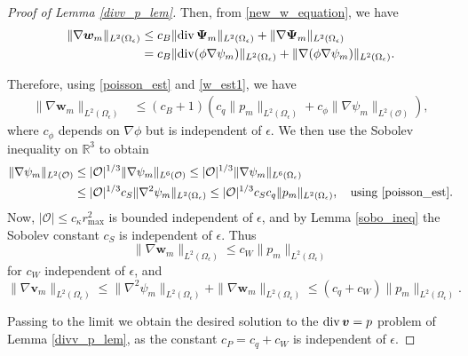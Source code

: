 \documentclass[11pt]{article}
\numberwithin{equation}{section}
\newcommand{\R}{\mathbb{R}}
\newcommand{\T}{\mathbb{T}}
\newcommand{\bu}{\bm{u}}
\newcommand{\bw}{\bm{w}}
\newcommand{\bv}{\bm{v}}
\newcommand{\ts}{\thinspace}
\newcommand{\dive}{{\rm{div}}}
\theoremstyle{definition}
\begin{document}
\begin{proof}[Proof of Lemma \ref{divv_p_lem}]
Then, from \eqref{new_w_equation}, we have
\begin{equation}\label{w_est1}
\begin{aligned}
\|\nabla\bw_m\|_{L^2(\Omega_{\epsilon})} &\le c_B\|\dive\ts {\bm \Psi}_m\|_{L^2(\Omega_{\epsilon})} + \|\nabla{\bm \Psi}_m\|_{L^2(\Omega_{\epsilon})} \\
&= c_B\|\dive(\phi\nabla \psi_m) \|_{L^2(\Omega_{\epsilon})} + \|\nabla(\phi\nabla \psi_m)\|_{L^2(\Omega_{\epsilon})} .
\end{aligned}
\end{equation}

Therefore, using \eqref{poisson_est} and \eqref{w_est1}, we have
\begin{align*}
\|\nabla \bw_m\|_{L^2(\Omega_{\epsilon})} &\le (c_B+1)(c_q\|p_m\|_{L^2(\Omega_{\epsilon})}+ c_{\phi}\|\nabla \psi_m\|_{L^2(\mathcal{O})}), 
\end{align*}
where $c_{\phi}$ depends on $\nabla\phi$ but is independent of $\epsilon$. We then use the Sobolev inequality on $\R^3$ to obtain 
\begin{align*}
 \|\nabla \psi_m\|_{L^2(\mathcal{O})} &\le  |\mathcal{O}|^{1/3} \|\nabla\psi_m\|_{L^6(\mathcal{O})} \le |\mathcal{O}|^{1/3} \|\nabla\psi_m\|_{L^6(\Omega_{\epsilon})} \\
 &\le |\mathcal{O}|^{1/3} c_S\|\nabla^2\psi_m\|_{L^2(\Omega_{\epsilon})}  \le |\mathcal{O}|^{1/3} c_S c_q \|p_m\|_{L^2(\Omega_{\epsilon})}, \quad \text{using }\eqref{poisson_est}.
 \end{align*}
Now, $|\mathcal{O}|\le c_{\kappa}r_{\max}^2$ is bounded independent of $\epsilon$, and by Lemma \ref{sobo_ineq} the Sobolev constant $c_S$ is independent of $\epsilon$. Thus
\[ \|\nabla \bw_m\|_{L^2(\Omega_{\epsilon})} \le c_W\|p_m\|_{L^2(\Omega_{\epsilon})} \]
for $c_W$ independent of $\epsilon$, and 
\[ \|\nabla \bv_m\|_{L^2(\Omega_{\epsilon})} \le \|\nabla^2\psi_m\|_{L^2(\Omega_{\epsilon})}+ \|\nabla \bw_m\|_{L^2(\Omega_{\epsilon})} \le (c_q+c_W)\|p_m\|_{L^2(\Omega_{\epsilon})}. \]

 Passing to the limit we obtain the desired solution to the $\dive \ts\bv=p$ problem of Lemma \eqref{divv_p_lem}, as the constant $c_P=c_q+c_W$ is independent of $\epsilon$.
 \end{proof}

%
\end{document}
